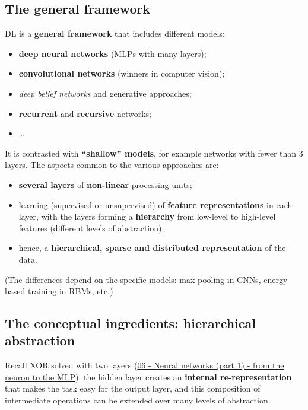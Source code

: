 \subsection{The general framework}\label{il-quadro-generale}

DL is a \textbf{general framework} that includes different models:

\begin{itemize}
\tightlist
\item
  \textbf{deep neural networks} (MLPs with many layers);
\item
  \textbf{convolutional networks} (winners in computer vision);
\item
  \emph{deep belief networks} and generative approaches;
\item
  \textbf{recurrent} and \textbf{recursive} networks;
\item
  \ldots{}
\end{itemize}

It is contrasted with \textbf{``shallow'' models}, for example networks
with fewer than 3 layers. The aspects common to the various approaches
are:

\begin{itemize}
\tightlist
\item
  \textbf{several layers} of \textbf{non-linear} processing units;
\item
  learning (supervised or unsupervised) of \textbf{feature
  representations} in each layer, with the layers forming a
  \textbf{hierarchy} from low-level to high-level features (different
  levels of abstraction);
\item
  hence, a \textbf{hierarchical, sparse and distributed representation}
  of the data.
\end{itemize}

(The differences depend on the specific models: max pooling in CNNs,
energy-based training in RBMs, etc.)

\subsection{The conceptual ingredients: hierarchical
abstraction}\label{gli-ingredienti-concettuali-astrazione-gerarchica}

Recall XOR solved with two layers
(\href{06\%20-\%20Reti\%20neurali\%20(parte\%201)\%20-\%20dal\%20neurone\%20al\%20MLP}{06
- Neural networks (part 1) - from the neuron to the MLP}): the hidden
layer creates an \textbf{internal re-representation} that makes the
task easy for the output layer, and this composition of intermediate
operations can be extended over many levels of abstraction.

